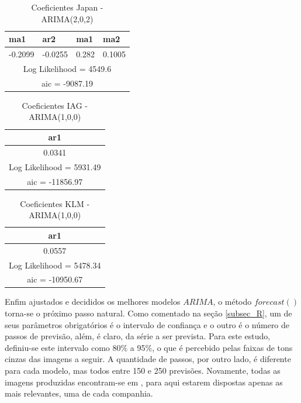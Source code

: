 \documentclass[12pt]{article}
\begin{document}
\begin{table}[H]
	\centering
	\begin{tabular}{|l|l|l|l|}
		\hline
		ma1        & ar2        & ma1      & ma2      \\ \hline
		-0.2099    & -0.0255    & 0.282    & 0.1005   \\ \hline
		\multicolumn{4}{|c|}{Log Likelihood = 4549.6} \\ \hline
		\multicolumn{4}{|c|}{aic = -9087.19}          \\ \hline
	\end{tabular}
\caption{Coeficientes Japan - ARIMA(2,0,2)}
\label{tab:Japan202}
\end{table}

\begin{table}[H]
	\centering
	\begin{tabular}{|c|}
		\hline
		ar1                      \\ \hline
		0.0341                   \\ \hline
		Log Likelihood = 5931.49	 \\ \hline
		aic = -11856.97          \\ \hline
	\end{tabular}
	\caption{Coeficientes IAG - ARIMA(1,0,0)}
	\label{tab:IAG100}
\end{table}

\begin{table}[H]
	\centering
	\begin{tabular}{|c|}
		\hline
		ar1                      \\ \hline
	    0.0557                   \\ \hline
		Log Likelihood = 5478.34	 \\ \hline
		aic = -10950.67          \\ \hline
	\end{tabular}
	\caption{Coeficientes KLM - ARIMA(1,0,0)}
	\label{tab:KLM100}
\end{table}

Enfim ajustados e decididos os melhores modelos $ARIMA$, o método $forecast()$ torna-se o próximo passo natural. Como comentado na seção \ref{subsec_R}, um de seus parâmetros obrigatórios é o intervalo de confiança e o outro é o número de passos de previsão, além, é claro, da série a ser prevista. Para este estudo, definiu-se este intervalo como 80\% a 95\%, o que é percebido pelas faixas de tons cinzas das imagens a seguir. A quantidade de passos, por outro lado, é diferente para cada modelo, mas todos entre 150 e 250 previsões. Novamente, todas as imagens produzidas encontram-se em \cite{git}, para aqui estarem dispostas apenas as mais relevantes, uma de cada companhia.
\end{document}
